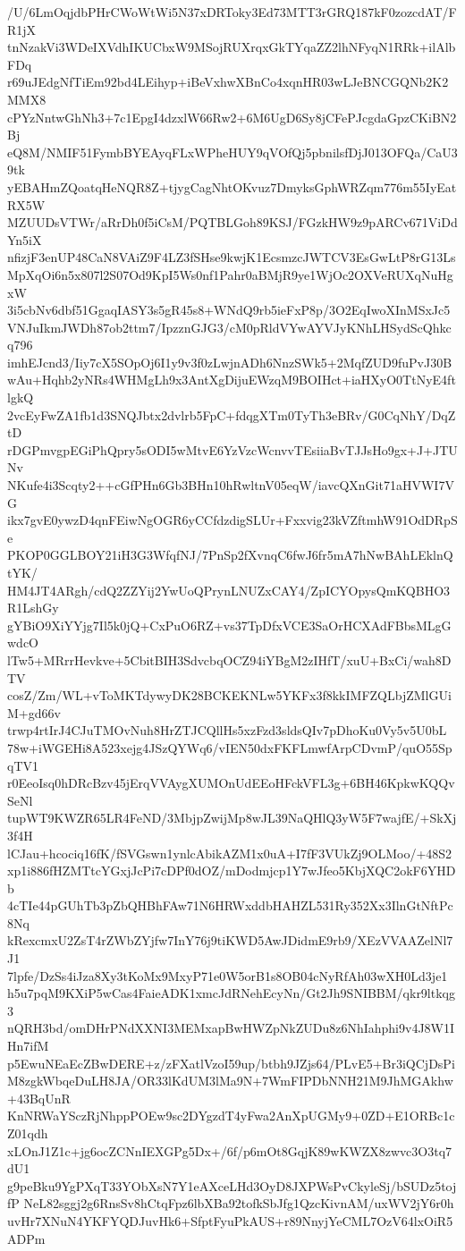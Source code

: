 /U/6LmOqjdbPHrCWoWtWi5N37xDRToky3Ed73MTT3rGRQ187kF0zozcdAT/FR1jX
tnNzakVi3WDeIXVdhIKUCbxW9MSojRUXrqxGkTYqaZZ2lhNFyqN1RRk+ilAlbFDq
r69uJEdgNfTiEm92bd4LEihyp+iBeVxhwXBnCo4xqnHR03wLJeBNCGQNb2K2MMX8
cPYzNntwGhNh3+7c1EpgI4dzxlW66Rw2+6M6UgD6Sy8jCFePJcgdaGpzCKiBN2Bj
eQ8M/NMIF51FymbBYEAyqFLxWPheHUY9qVOfQj5pbnilsfDjJ013OFQa/CaU39tk
yEBAHmZQoatqHeNQR8Z+tjygCagNhtOKvuz7DmyksGphWRZqm776m55IyEatRX5W
MZUUDsVTWr/aRrDh0f5iCsM/PQTBLGoh89KSJ/FGzkHW9z9pARCv671ViDdYn5iX
nfizjF3enUP48CaN8VAiZ9F4LZ3fSHse9kwjK1EcsmzcJWTCV3EsGwLtP8rG13Ls
MpXqOi6n5x807l2S07Od9KpI5Ws0nf1Pahr0aBMjR9ye1WjOc2OXVeRUXqNuHgxW
3i5cbNv6dbf51GgaqIASY3s5gR45s8+WNdQ9rb5ieFxP8p/3O2EqIwoXInMSxJc5
VNJuIkmJWDh87ob2ttm7/IpzznGJG3/cM0pRldVYwAYVJyKNhLHSydScQhkcq796
imhEJcnd3/Iiy7cX5SOpOj6I1y9v3f0zLwjnADh6NnzSWk5+2MqfZUD9fuPvJ30B
wAu+Hqhb2yNRs4WHMgLh9x3AntXgDijuEWzqM9BOIHct+iaHXyO0TtNyE4ftlgkQ
2vcEyFwZA1fb1d3SNQJbtx2dvlrb5FpC+fdqgXTm0TyTh3eBRv/G0CqNhY/DqZtD
rDGPmvgpEGiPhQpry5sODI5wMtvE6YzVzcWcnvvTEsiiaBvTJJsHo9gx+J+JTUNv
NKufe4i3Scqty2++cGfPHn6Gb3BHn10hRwltnV05eqW/iavcQXnGit71aHVWI7VG
ikx7gvE0ywzD4qnFEiwNgOGR6yCCfdzdigSLUr+Fxxvig23kVZftmhW91OdDRpSe
PKOP0GGLBOY21iH3G3WfqfNJ/7PnSp2fXvnqC6fwJ6fr5mA7hNwBAhLEklnQtYK/
HM4JT4ARgh/cdQ2ZZYij2YwUoQPrynLNUZxCAY4/ZpICYOpysQmKQBHO3R1LshGy
gYBiO9XiYYjg7Il5k0jQ+CxPuO6RZ+vs37TpDfxVCE3SaOrHCXAdFBbsMLgGwdcO
lTw5+MRrrHevkve+5CbitBIH3SdvcbqOCZ94iYBgM2zIHfT/xuU+BxCi/wah8DTV
cosZ/Zm/WL+vToMKTdywyDK28BCKEKNLw5YKFx3f8kkIMFZQLbjZMlGUiM+gd66v
trwp4rtIrJ4CJuTMOvNuh8HrZTJCQllHs5xzFzd3sldsQIv7pDhoKu0Vy5v5U0bL
78w+iWGEHi8A523xejg4JSzQYWq6/vIEN50dxFKFLmwfArpCDvmP/quO55SpqTV1
r0EeoIsq0hDRcBzv45jErqVVAygXUMOnUdEEoHFckVFL3g+6BH46KpkwKQQvSeNl
tupWT9KWZR65LR4FeND/3MbjpZwijMp8wJL39NaQHlQ3yW5F7wajfE/+SkXj3f4H
lCJau+hcociq16fK/fSVGswn1ynlcAbikAZM1x0uA+I7fF3VUkZj9OLMoo/+48S2
xp1i886fHZMTtcYGxjJcPi7cDPf0dOZ/mDodmjcp1Y7wJfeo5KbjXQC2okF6YHDb
4cTIe44pGUhTb3pZbQHBhFAw71N6HRWxddbHAHZL531Ry352Xx3IlnGtNftPc8Nq
kRexcmxU2ZsT4rZWbZYjfw7InY76j9tiKWD5AwJDidmE9rb9/XEzVVAAZelNl7J1
7lpfe/DzSs4iJza8Xy3tKoMx9MxyP71e0W5orB1s8OB04cNyRfAh03wXH0Ld3je1
h5u7pqM9KXiP5wCas4FaieADK1xmcJdRNehEcyNn/Gt2Jh9SNIBBM/qkr9ltkqg3
nQRH3bd/omDHrPNdXXNI3MEMxapBwHWZpNkZUDu8z6NhIahphi9v4J8W1IHn7ifM
p5EwuNEaEcZBwDERE+z/zFXatlVzoI59up/btbh9JZjs64/PLvE5+Br3iQCjDsPi
M8zgkWbqeDuLH8JA/OR33lKdUM3lMa9N+7WmFIPDbNNH21M9JhMGAkhw+43BqUnR
KnNRWaYSczRjNhppPOEw9sc2DYgzdT4yFwa2AnXpUGMy9+0ZD+E1ORBc1cZ01qdh
xLOnJ1Z1c+jg6ocZCNnIEXGPg5Dx+/6f/p6mOt8GqjK89wKWZX8zwvc3O3tq7dU1
g9peBku9YgPXqT33YObXsN7Y1eAXceLHd3OyD8JXPWsPvCkyleSj/bSUDz5tojfP
NeL82sggj2g6RnsSv8hCtqFpz6lbXBa92tofkSbJfg1QzcKivnAM/uxWV2jY6r0h
uvHr7XNuN4YKFYQDJuvHk6+SfptFyuPkAUS+r89NnyjYeCML7OzV64lxOiR5ADPm
